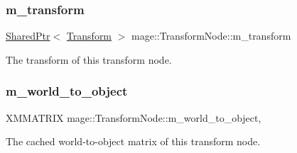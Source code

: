 \subsubsection{\texorpdfstring{m\+\_\+transform}{m\_transform}}
{\footnotesize\ttfamily \hyperlink{namespacemage_a1e01ae66713838a7a67d30e44c67703e}{Shared\+Ptr}$<$ \hyperlink{structmage_1_1_transform}{Transform} $>$ mage\+::\+Transform\+Node\+::m\+\_\+transform\hspace{0.3cm}{\ttfamily [private]}}

The transform of this transform node. \hypertarget{structmage_1_1_transform_node_ade413fc9a980ce8e1191c17f94f25e3f}{}\label{structmage_1_1_transform_node_ade413fc9a980ce8e1191c17f94f25e3f} 
\subsubsection{\texorpdfstring{m\+\_\+world\+\_\+to\+\_\+object}{m\_world\_to\_object}}
{\footnotesize\ttfamily X\+M\+M\+A\+T\+R\+IX mage\+::\+Transform\+Node\+::m\+\_\+world\+\_\+to\+\_\+object\hspace{0.3cm}{\ttfamily [mutable]}, {\ttfamily [private]}}

The cached world-\/to-\/object matrix of this transform node. 